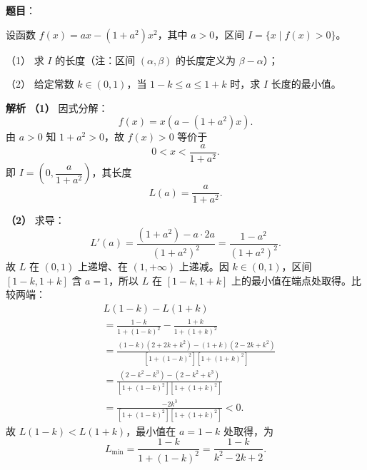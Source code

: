 \begin{answer}

\textbf{题目}：

设函数 $f(x)=ax-(1+a^2)x^2$，其中 $a>0$，区间 $I=\{x\mid f(x)>0\}$。

（1） 求 $I$ 的长度（注：区间 $(\alpha,\beta)$ 的长度定义为 $\beta-\alpha$）；

（2） 给定常数 $k\in(0,1)$，当 $1-k\leqslant a\leqslant1+k$ 时，求 $I$ 长度的最小值。

\textbf{解析}
\textbf{（1）} 因式分解：
\nopagebreak[4]
\[f(x)=x\left(a-(1+a^2)x\right).\]
由 $a>0$ 知 $1+a^2>0$，故 $f(x)>0$ 等价于
\nopagebreak[4]
\[0<x<\frac a{1+a^2}.\]
即 $I=\left(0,\dfrac a{1+a^2}\right)$，其长度
\nopagebreak[4]
\[L(a)=\frac a{1+a^2}.\]

\textbf{（2）} 求导：
\nopagebreak[4]
\[L'(a)=\frac{(1+a^2)-a\cdot2a}{(1+a^2)^2}=\frac{1-a^2}{(1+a^2)^2}.\]
故 $L$ 在 $(0,1)$ 上递增、在 $(1,+\infty)$ 上递减。因 $k\in(0,1)$，区间 $[1-k,1+k]$ 含 $a=1$，所以 $L$ 在 $[1-k,1+k]$ 上的最小值在端点处取得。比较两端：
\nopagebreak[4]
\[\begin{aligned}
&L(1-k)-L(1+k)\\
&=\frac{1-k}{1+(1-k)^2}-\frac{1+k}{1+(1+k)^2}\\
&=\frac{(1-k)(2+2k+k^2)-(1+k)(2-2k+k^2)}
{\left[1+(1-k)^2\right]\left[1+(1+k)^2\right]}\\
&=\frac{(2-k^2-k^3)-(2-k^2+k^3)}
{\left[1+(1-k)^2\right]\left[1+(1+k)^2\right]}\\
&=\frac{-2k^3}{\left[1+(1-k)^2\right]\left[1+(1+k)^2\right]}<0.
\end{aligned}\]
故 $L(1-k)<L(1+k)$，最小值在 $a=1-k$ 处取得，为
\nopagebreak[4]
\[L_{\min}=\frac{1-k}{1+(1-k)^2}=\frac{1-k}{k^2-2k+2}.\]



\end{answer}
